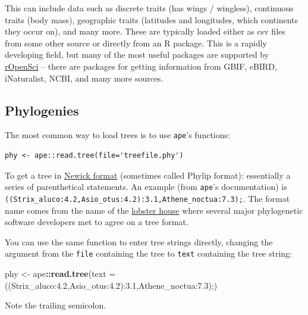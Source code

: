 \documentclass[
]{article}
\newenvironment{Shaded}{\begin{snugshade}}{\end{snugshade}}
\newcommand{\DataTypeTok}[1]{\textcolor[rgb]{0.13,0.29,0.53}{#1}}
\newcommand{\KeywordTok}[1]{\textcolor[rgb]{0.13,0.29,0.53}{\textbf{#1}}}
\newcommand{\NormalTok}[1]{#1}
\newcommand{\OperatorTok}[1]{\textcolor[rgb]{0.81,0.36,0.00}{\textbf{#1}}}
\newcommand{\StringTok}[1]{\textcolor[rgb]{0.31,0.60,0.02}{#1}}
\begin{document}
This can include data such as discrete traits (has wings / wingless), continuous traits (body mass), geographic traits (latitudes and longitudes, which continents they occur on), and many more. These are typically loaded either as csv files from some other source or directly from an R package. This is a rapidly developing field, but many of the most useful packages are supported by \href{https://ropensci.org/packages/}{rOpenSci} -- there are packages for getting information from GBIF, eBIRD, iNaturalist, NCBI, and many more sources.

\hypertarget{phylogenies}{%
\subsection{Phylogenies}\label{phylogenies}}

The most common way to load trees is to use \texttt{ape}'s functions:

\begin{verbatim}
phy <- ape::read.tree(file='treefile.phy')
\end{verbatim}

To get a tree in \href{http://evolution.genetics.washington.edu/phylip/newicktree.html}{Newick format} (sometimes called Phylip format): essentially a series of parenthetical statements. An example (from \texttt{ape}'s documentation) is \texttt{((Strix\_aluco:4.2,Asio\_otus:4.2):3.1,Athene\_noctua:7.3);}. The format name comes from the name of the \href{http://newicks.com}{lobster house} where several major phylogenetic software developers met to agree on a tree format.

You can use the same function to enter tree strings directly, changing the argument from the \texttt{file} containing the tree to \texttt{text} containing the tree string:

\begin{Shaded}
\begin{Highlighting}[]
\NormalTok{phy <{-}}\StringTok{ }\NormalTok{ape}\OperatorTok{::}\KeywordTok{read.tree}\NormalTok{(}\DataTypeTok{text =} \StringTok{\textquotesingle{}((Strix\_aluco:4.2,Asio\_otus:4.2):3.1,Athene\_noctua:7.3);\textquotesingle{}}\NormalTok{)}
\end{Highlighting}
\end{Shaded}

Note the trailing semicolon.
\end{document}
